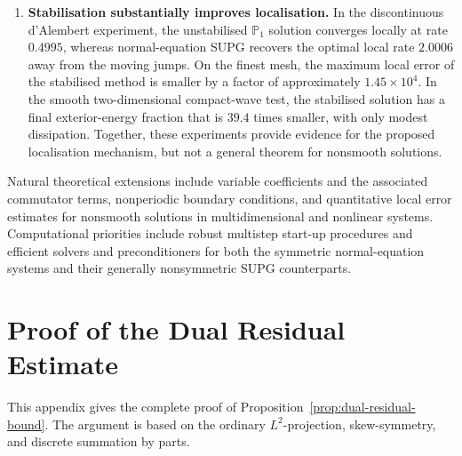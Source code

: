 \documentclass[11pt]{article}
\begin{document}
\begin{enumerate}[label=\arabic*.,leftmargin=*,itemsep=0.65em,topsep=0.5em]
\item \textbf{Stabilisation substantially improves localisation.}
In the discontinuous d'Alembert experiment, the unstabilised \(\mathbb P_1\) solution
converges locally at rate \(0.4995\), whereas normal-equation SUPG recovers the
optimal local rate \(2.0006\) away from the moving jumps. On the finest mesh,
the maximum local error of the stabilised method is smaller by a factor of
approximately \(1.45\times10^4\). In the smooth two-dimensional compact-wave
test, the stabilised solution has a final exterior-energy fraction that is
\(39.4\) times smaller, with only modest dissipation. Together, these
experiments provide evidence for the proposed localisation mechanism, but not
a general theorem for nonsmooth solutions.
\end{enumerate}

Natural theoretical extensions include variable coefficients and the
associated commutator terms, nonperiodic boundary conditions, and quantitative
local error estimates for nonsmooth solutions in multidimensional and
nonlinear systems. Computational priorities include robust multistep start-up
procedures and efficient solvers and preconditioners for both the symmetric
normal-equation systems and their generally nonsymmetric SUPG counterparts.

\clearpage

\appendix


\section{Proof of the Dual Residual Estimate}
\label{app:dual-residual-proof}
This appendix gives the complete proof of
Proposition~\ref{prop:dual-residual-bound}. The argument is based on the
ordinary \(L^2\)-projection, skew-symmetry, and discrete summation by parts.
\end{document}
